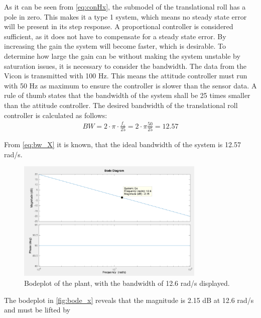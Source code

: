 As it can be seen from \autoref{eq:conHx}, the submodel of the translational roll has a pole in zero. This makes it a type 1 system, which means no steady state error will be present in its step response. 
A proportional controller is considered sufficient, as it does not have to compensate for a steady state error. By increasing the gain the system will become faster, which is desirable. To determine how large the gain can be without making the system unstable by saturation issues, it is necessary to consider the bandwidth. \newpar
The data from the Vicon is transmitted with 100 Hz. This means the attitude controller must run with 50 Hz as maximum to ensure the controller is slower than the sensor data. A rule of thumb states that the bandwidth of the system shall be 25 times smaller than the attitude controller. The desired bandwidth of the translational roll controller is calculated as follows:
\begin{align}
BW=2\cdot \pi\cdot \frac{f_s}{25}=2\cdot \pi \frac{50}{25}=12.57\label{eq:bw_X}
\end{align}
\begin{where}
\end{where}

From \autoref{eq:bw_X} it is known, that the ideal bandwidth of the system is 12.57 rad/s. 
\begin{figure}[H]
	\centering
	\includegraphics[width=0.8\textwidth]{figures/bode_x.png}
	\caption{Bodeplot of the plant, with the bandwidth of 12.6 rad/s displayed.}\label{fig:bode_x}
\end{figure}
The bodeplot in \autoref{fig:bode_x} reveals that the magnitude is 2.15 dB at 12.6 rad/s and must be lifted by 

